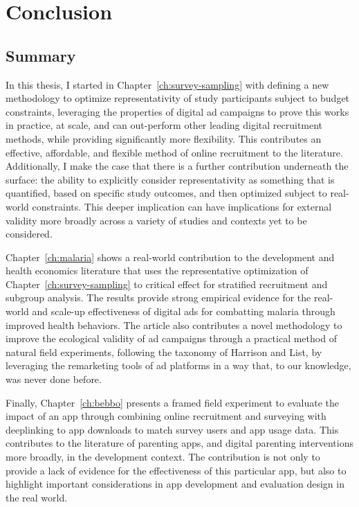 \chapter{Conclusion}
\label{ch:conclusion}

\section{Summary}

In this thesis, I started in Chapter~\ref{ch:survey-sampling} with defining a new methodology to optimize representativity of study participants subject to budget constraints, leveraging the properties of digital ad campaigns to prove this works in practice, at scale, and can out-perform other leading digital recruitment methods, while providing significantly more flexibility. This contributes an effective, affordable, and flexible method of online recruitment to the literature. Additionally, I make the case that there is a further contribution underneath the surface: the ability to explicitly consider representativity as something that is quantified, based on specific study outcomes, and then optimized subject to real-world constraints. This deeper implication can have implications for external validity more broadly across a variety of studies and contexts yet to be considered.

Chapter~\ref{ch:malaria} shows a real-world contribution to the development and health economics literature that uses the representative optimization of Chapter~\ref{ch:survey-sampling} to critical effect for stratified recruitment and subgroup analysis. The results provide strong empirical evidence for the real-world and scale-up effectiveness of digital ads for combatting malaria through improved health behaviors. The article also contributes a novel methodology to improve the ecological validity of ad campaigns through a practical method of natural field experiments, following the taxonomy of Harrison and List, by leveraging the remarketing tools of ad platforms in a way that, to our knowledge, was never done before.  

Finally, Chapter~\ref{ch:bebbo} presents a framed field experiment to evaluate the impact of an app through combining online recruitment and surveying with deeplinking to app downloads to match survey users and app usage data. This contributes to the literature of parenting apps, and digital parenting interventions more broadly, in the development context. The contribution is not only to provide a lack of evidence for the effectiveness of this particular app, but also to highlight important considerations in app development and evaluation design in the real world. 


